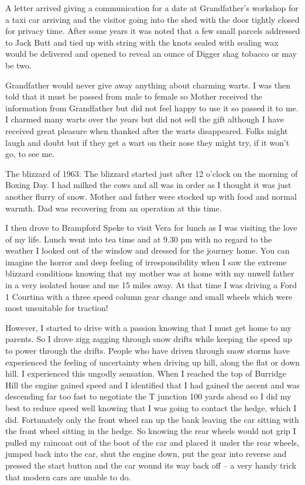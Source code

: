 A letter arrived giving a communication for a date at Grandfather's workshop for
a taxi car arriving and the visitor going into the shed with the door tightly
closed for privacy time.  After some years it was noted that a few small
parcels addressed to Jack Butt and tied up with string with the knots sealed
with sealing wax would be delivered and opened to reveal an ounce of Digger
shag tobacco or may be two.

Grandfather would never give away anything about charming warts.  I was then
told that it must be passed from male to female so Mother received the
information from Grandfather but did not feel happy to use it so passed it to
me.  I charmed many warts over the years but did not sell the gift although I
have received great pleasure when thanked after the warts disappeared.  Folks
might laugh and doubt but if they get a wart on their nose they might try, if
it won't go, to see me.

The blizzard of 1963:  The blizzard started just after 12 o'clock on the morning
of Boxing Day.  I had milked the cows and all was in order as I thought it was
just another flurry of snow.  Mother and father were stocked up with food and
normal warmth.  Dad was recovering from an operation at this time.

I then drove to Brampford Speke to visit Vera for lunch as I was visiting the
love of my life.  Lunch went into tea time and at 9.30 pm with no regard to the
weather I looked out of the window and dressed for the journey home.  You can
imagine the horror and deep feeling of irresponsibility when I saw the extreme
blizzard conditions knowing that my mother was at home with my unwell father in
a very isolated house and me 15 miles away.  At that time I was driving a Ford
1 Courtina with a three speed column gear change and small wheels which were
most unsuitable for traction!

However, I started to drive with a passion knowing that I must get home to my
parents.  So I drove zigg zagging through snow drifts while keeping the speed
up to power through the drifts. People who have driven through snow storms have
experienced the feeling of uncertainty when driving up hill, along the flat or
down hill.  I experienced this ungodly sensation.  When I reached the top of
Burridge Hill the engine gained speed and I identified that I had gained the
ascent and was descending far too fast to negotiate the T junction 100 yards
ahead so I did my best to reduce speed well knowing that I was going to contact
the hedge, which I did.  Fortunately only the front wheel ran up the bank
leaving the car sitting with the front wheel sitting in the hedge.  So knowing
the rear wheels would not grip I pulled my raincoat out of the boot of the car
and placed it under the rear wheels, jumped back into the car, shut the engine
down, put the gear into reverse and pressed the start button and the car wound
its way back off – a very handy trick that modern cars are unable to do.

